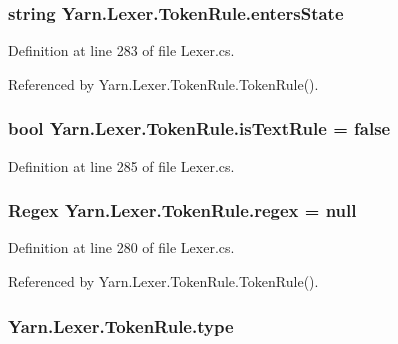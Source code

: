 \hypertarget{a00166_af6a4bd3416c4e1b8e56f9db461d52d18}{
\subsubsection[{enters\-State}]{\setlength{\rightskip}{0pt plus 5cm}string Yarn.\-Lexer.\-Token\-Rule.\-enters\-State}}\label{a00166_af6a4bd3416c4e1b8e56f9db461d52d18}


Definition at line 283 of file Lexer.\-cs.



Referenced by Yarn.\-Lexer.\-Token\-Rule.\-Token\-Rule().

\hypertarget{a00166_a09f49e6edf9ace38a92d723998181f8f}{
\subsubsection[{is\-Text\-Rule}]{\setlength{\rightskip}{0pt plus 5cm}bool Yarn.\-Lexer.\-Token\-Rule.\-is\-Text\-Rule = false}}\label{a00166_a09f49e6edf9ace38a92d723998181f8f}


Definition at line 285 of file Lexer.\-cs.

\hypertarget{a00166_a47a404d6637fae489c3c77729a01cc69}{
\subsubsection[{regex}]{\setlength{\rightskip}{0pt plus 5cm}Regex Yarn.\-Lexer.\-Token\-Rule.\-regex = null}}\label{a00166_a47a404d6637fae489c3c77729a01cc69}


Definition at line 280 of file Lexer.\-cs.



Referenced by Yarn.\-Lexer.\-Token\-Rule.\-Token\-Rule().

\hypertarget{a00166_a0de6fac3b55cf0c61e07cea53ce67caa}{
\subsubsection[{type}]{ Yarn.\-Lexer.\-Token\-Rule.\-type}}\label{a00166_a0de6fac3b55cf0c61e07cea53ce67caa}


